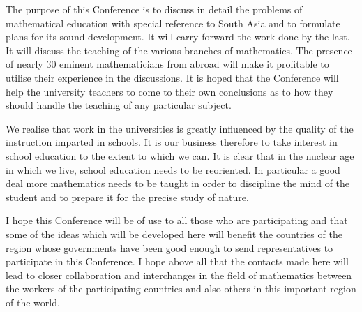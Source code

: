 The purpose of this Conference is to discuss in detail the problems of
mathematical education with special reference to South Asia and to
formulate plans for its sound development. It will carry forward the
work done by the last. It will discuss the teaching of the various
branches of mathematics. The presence of nearly 30 eminent
mathematicians from abroad will make it profitable to utilise their
experience in the discussions. It is hoped that the Conference will
help the university teachers to come to their own conclusions as to
how they should handle the teaching of any particular subject. 

We realise that work in the universities is greatly influenced by the
quality of the instruction imparted in schools. It is our business
therefore to take interest in school education to the extent to which
we can. It is clear that in the nuclear age in which we live, school
education needs to be reoriented. In particular a good deal more
mathematics needs to be taught in order to discipline the mind of the
student and to prepare it for the precise study of nature. 

I hope this Conference will be of use to all those who are
participating and that some of the ideas which will be developed here
will benefit the countries of the region whose governments have been
good enough to send representatives to participate in this
Conference. I hope above all that the contacts made here will lead to
closer collaboration and interchanges in the field of mathematics
between the workers of the participating countries and also others in
this important region of the world.


